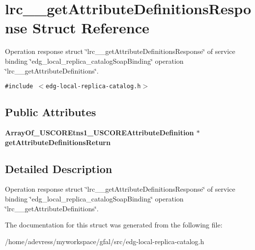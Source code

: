 \section{lrc\_\-\_\-get\-Attribute\-Definitions\-Response Struct Reference}
\label{structlrc____getAttributeDefinitionsResponse}
Operation response struct \char`\"{}lrc\_\-\_\-get\-Attribute\-Definitions\-Response\char`\"{} of service binding \char`\"{}edg\_\-local\_\-replica\_\-catalog\-Soap\-Binding\char`\"{} operation \char`\"{}lrc\_\-\_\-get\-Attribute\-Definitions\char`\"{}.  


{\tt \#include $<$edg-local-replica-catalog.h$>$}

\subsection*{Public Attributes}
\begin{CompactItemize}
\item 
\bf{Array\-Of\_\-USCOREtns1\_\-USCOREAttribute\-Definition} $\ast$ \textbf{get\-Attribute\-Definitions\-Return}\label{structlrc____getAttributeDefinitionsResponse_064a7a03101036dd1889b43036b2d124}

\end{CompactItemize}


\subsection{Detailed Description}
Operation response struct \char`\"{}lrc\_\-\_\-get\-Attribute\-Definitions\-Response\char`\"{} of service binding \char`\"{}edg\_\-local\_\-replica\_\-catalog\-Soap\-Binding\char`\"{} operation \char`\"{}lrc\_\-\_\-get\-Attribute\-Definitions\char`\"{}. 



The documentation for this struct was generated from the following file:\begin{CompactItemize}
\item 
/home/adevress/myworkspace/gfal/src/edg-local-replica-catalog.h\end{CompactItemize}
